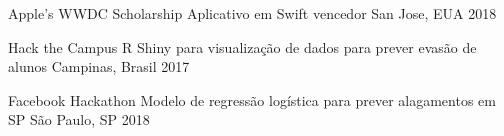 \begin{cvhonors}

  \cvhonor
    {Apple's WWDC Scholarship}
    {Aplicativo em Swift vencedor}
    {San Jose, EUA}
    {2018}


  \cvhonor
    {Hack the Campus}
    {R Shiny para visualização de dados para prever evasão de alunos}
    {Campinas, Brasil}
    {2017}





  \cvhonor
    {Facebook Hackathon}
    {Modelo de regressão logística para prever alagamentos em SP}
    {São Paulo, SP}
    {2018}



\end{cvhonors}
